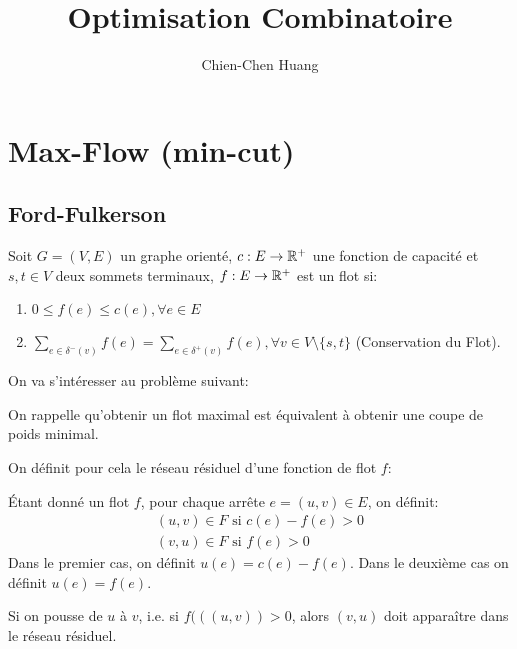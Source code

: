 \documentclass[math, info]{cours}
\title{Optimisation Combinatoire}
\author{Chien-Chen Huang}
\begin{document}
\bettertitle
\section{Max-Flow (min-cut)}
\subsection{Ford-Fulkerson}
\begin{definition}
	Soit $G = \left(V, E\right)$ un graphe orienté, $c: E \to \mathbb{R}^{+}$ une fonction de capacité et $s, t \in V$ deux sommets terminaux,
	$f: E\to \mathbb{R}^{+}$ est un flot si:
	\begin{enumerate}
		\item $0 \leq f(e) \leq c(e), \forall e \in E$
		\item $\sum_{e \in \delta^{-}(v)} f(e) = \sum_{e \in \delta^{+}(v)} f(e), \forall v \in V \setminus \{s, t\}$ (Conservation du Flot).
	\end{enumerate}
	\label{def:flot}
\end{definition}

On va s'intéresser au problème suivant:

\begin{thm}
	On rappelle qu'obtenir un flot maximal est équivalent à obtenir une coupe de poids minimal.
\end{thm}

On définit pour cela le réseau résiduel d'une fonction de flot $f$:
\begin{definition}
	Étant donné un flot $f$, pour chaque arrête $e = (u, v) \in E$, on définit:
	\begin{align*}
		(u, v) \in F \text{ si } c(e) - f(e) > 0 \\
		(v, u) \in F \text{ si } f(e) > 0
	\end{align*}
	Dans le premier cas, on définit $u(e) = c(e) - f(e)$. Dans le deuxième cas on définit $u(e) = f(e)$.
	\label{def:residualnetwork}
\end{definition}

\begin{proposition}
	Si on pousse de $u$ à $v$, i.e. si $f(((u, v)) > 0$, alors $(v, u)$ doit apparaître dans le réseau résiduel.
	\label{prop:pakompri}
\end{proposition}
\end{document}
